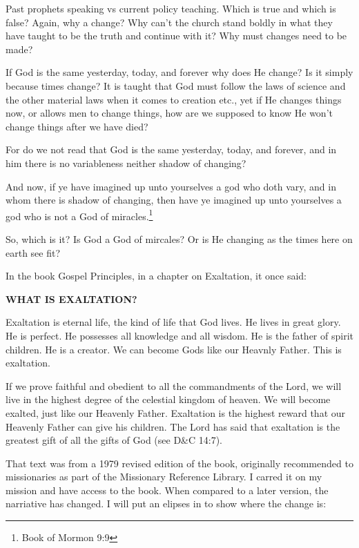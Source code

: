 \documentclass{article}
\begin{document}
Past prophets speaking vs current policy teaching. Which is true and which is
false? Again, why a change? Why can't the church stand boldly in what they have
taught to be the truth and continue with it? Why must changes need to be made?

If God is the same yesterday, today, and forever why does He change? Is it
simply because times change? It is taught that God must follow the laws of
science and the other material laws when it comes to creation etc., yet if He
changes things now, or allows men to change things, how are we supposed to know
He won't change things after we have died?

\begin{displayquote}
For do we not read that God is the same yesterday, today, and forever, and 
in him there is no variableness neither shadow of 
changing?

And now, if ye have imagined up unto yourselves a god who doth vary, and in 
whom there is shadow of changing, then have ye imagined up unto yourselves a 
god who is not a God of miracles.\footnote{Book of Mormon 9:9}
\end{displayquote}

So, which is it? Is God a God of mircales? Or is He changing as the times here
on earth see fit?

In the book Gospel Principles, in a chapter on Exaltation, it once said:

\begin{displayquote}
\textbf{WHAT IS EXALTATION?}

Exaltation is eternal life, the kind of life that God lives. He lives in great
glory. He is perfect. He possesses all knowledge and all wisdom. He is the
father of spirit children. He is a creator. We can become Gods like our Heavnly
Father. This is exaltation.

If we prove faithful and obedient to all the commandments of the Lord, we will
live in the highest degree of the celestial kingdom of heaven. We will become
exalted, just like our Heavenly Father. Exaltation is the highest reward that
our Heavenly Father can give his children. The Lord has said that exaltation
is the greatest gift of all the gifts of 
God (see D\&C 14:7).\cite[pp. 289-290]{gp}
\end{displayquote}

That text was from a 1979 revised edition of the book, originally recommended
to missionaries as part of the Missionary Reference Library. I carred it on 
my mission and have access to the book. When compared to a later version, 
the narriative has changed. I will put an elipses in to show where the 
change is:
\end{document}
